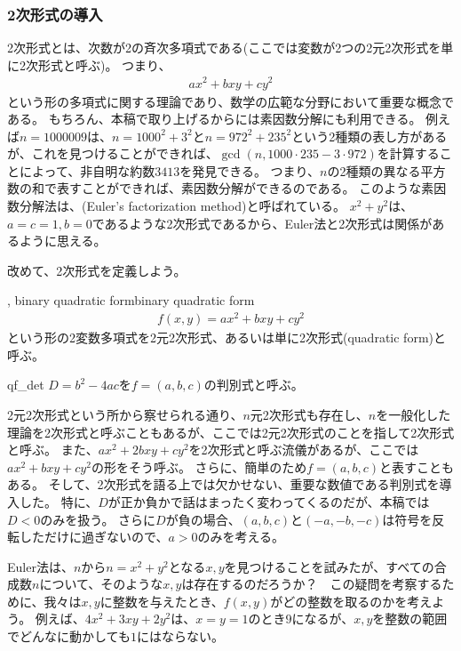 \subsubsection{2次形式の導入}
2次形式とは、次数が2の斉次多項式である(ここでは変数が2つの2元2次形式を単に2次形式と呼ぶ)。
つまり、
\begin{align*}
ax^2 + bxy + cy^2
\end{align*}
という形の多項式に関する理論であり、数学の広範な分野において重要な概念である。
もちろん、本稿で取り上げるからには素因数分解にも利用できる。
例えば$n=1000009$は、$n=1000^2+3^2$と$n=972^2+235^2$という2種類の表し方があるが、これを見つけることができれば、$\gcd(n, 1000\cdot235 - 3\cdot972)$を計算することによって、非自明な約数$3413$を発見できる。
つまり、$n$の2種類の異なる平方数の和で表すことができれば、素因数分解ができるのである。
このような素因数分解法は、(Euler's factorization method)と呼ばれている。
$x^2+y^2$は、$a=c=1,b=0$であるような2次形式であるから、Euler法と2次形式は関係があるように思える。

改めて、2次形式を定義しよう。

\begin{Defi}{, binary quadratic form}{binary quadratic form}
\begin{align*}
f(x,y) = ax^2 + bxy + cy^2
\end{align*}
という形の2変数多項式を2元2次形式、あるいは単に2次形式(quadratic form)と呼ぶ。
\end{Defi}

\begin{Defi}{}{qf_det}
$D=b^2-4ac$を$f=(a,b,c)$の判別式と呼ぶ。
\end{Defi}

2元2次形式という所から察せられる通り、$n$元2次形式も存在し、$n$を一般化した理論を2次形式と呼ぶこともあるが、ここでは2元2次形式のことを指して2次形式と呼ぶ。
また、$ax^2 + 2bxy + cy^2$を2次形式と呼ぶ流儀があるが、ここでは$ax^2 + bxy + cy^2$の形をそう呼ぶ。
さらに、簡単のため$f=(a,b,c)$と表すこともある。
そして、2次形式を語る上では欠かせない、重要な数値である判別式を導入した。
特に、$D$が正か負かで話はまったく変わってくるのだが、本稿では$D<0$のみを扱う。
さらに$D$が負の場合、$(a,b,c)$と$(-a,-b,-c)$は符号を反転しただけに過ぎないので、$a>0$のみを考える。

Euler法は、$n$から$n=x^2+y^2$となる$x,y$を見つけることを試みたが、すべての合成数$n$について、そのような$x,y$は存在するのだろうか？　この疑問を考察するために、我々は$x,y$に整数を与えたとき、$f(x,y)$がどの整数を取るのかを考えよう。
例えば、$4x^2+3xy+2y^2$は、$x=y=1$のとき$9$になるが、$x,y$を整数の範囲でどんなに動かしても$1$にはならない。

